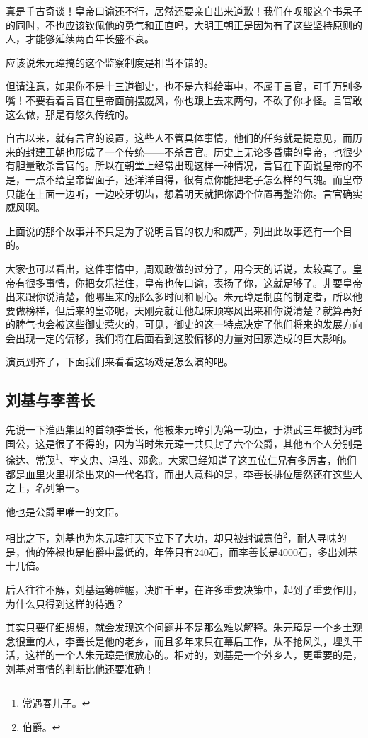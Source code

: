 \begin{multicols}{\theparacolNo}
		真是千古奇谈！皇帝口谕还不行，居然还要亲自出来道歉！我们在叹服这个书呆子的同时，不也应该钦佩他的勇气和正直吗，大明王朝正是因为有了这些坚持原则的人，才能够延续两百年长盛不衰。

		应该说朱元璋搞的这个监察制度是相当不错的。

		但请注意，如果你不是十三道御史，也不是六科给事中，不属于言官，可千万别多嘴！不要看着言官在皇帝面前摆威风，你也跟上去来两句，不砍了你才怪。言官敢这么做，那是有悠久传统的。

		自古以来，就有言官的设置，这些人不管具体事情，他们的任务就是提意见，而历来的封建王朝也形成了一个传统——不杀言官。历史上无论多昏庸的皇帝，也很少有胆量敢杀言官的。所以在朝堂上经常出现这样一种情况，言官在下面说皇帝的不是，一点不给皇帝留面子，还洋洋自得，很有点你能把老子怎么样的气魄。而皇帝只能在上面一边听，一边咬牙切齿，想着明天就把你调个位置再整治你。言官确实威风啊。

		上面说的那个故事并不只是为了说明言官的权力和威严，列出此故事还有一个目的。

		大家也可以看出，这件事情中，周观政做的过分了，用今天的话说，太较真了。皇帝有很多事情，你把女乐拦住，皇帝也传口谕，表扬了你，这就足够了。非要皇帝出来跟你说清楚，他哪里来的那么多时间和耐心。朱元璋是制度的制定者，所以他要做榜样，但后来的皇帝呢，天刚亮就让他起床顶寒风出来和你说清楚？就算再好的脾气也会被这些御史惹火的，可见，御史的这一特点决定了他们将来的发展方向会出现一定的偏移，我们将在后面看到这股偏移的力量对国家造成的巨大影响。

		演员到齐了，下面我们来看看这场戏是怎么演的吧。

		\subsection{刘基与李善长}
		先说一下淮西集团的首领李善长，他被朱元璋引为第一功臣，于洪武三年被封为韩国公，这是很了不得的，因为当时朱元璋一共只封了六个公爵，其他五个人分别是徐达、常茂\footnote{常遇春儿子。}、李文忠、冯胜、邓愈。大家已经知道了这五位仁兄有多厉害，他们都是血里火里拼杀出来的一代名将，而出人意料的是，李善长排位居然还在这些人之上，名列第一。

		他也是公爵里唯一的文臣。

		相比之下，刘基也为朱元璋打天下立下了大功，却只被封诚意伯\footnote{伯爵。}，耐人寻味的是，他的俸禄也是伯爵中最低的，年俸只有240石，而李善长是4000石，多出刘基十几倍。

		后人往往不解，刘基运筹帷幄，决胜千里，在许多重要决策中，起到了重要作用，为什么只得到这样的待遇？

		其实只要仔细想想，就会发现这个问题并不是那么难以解释。朱元璋是一个乡土观念很重的人，李善长是他的老乡，而且多年来只在幕后工作，从不抢风头，埋头干活，这样的一个人朱元璋是很放心的。相对的，刘基是一个外乡人，更重要的是，刘基对事情的判断比他还要准确！


\end{multicols}
